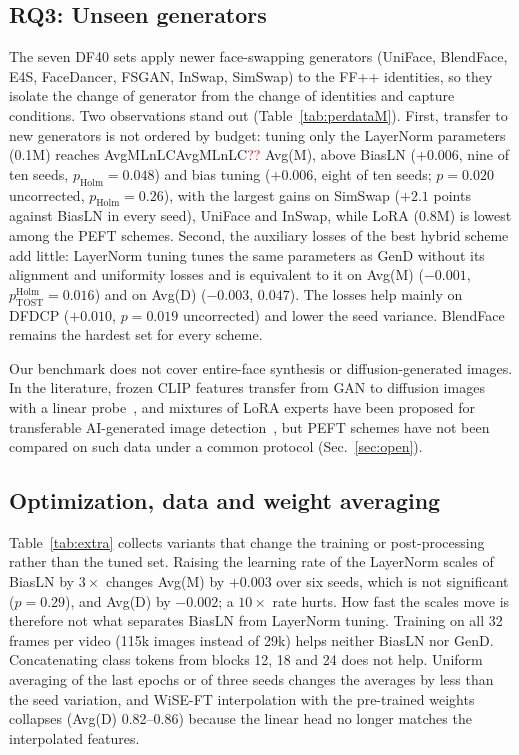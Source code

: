\documentclass[fonts]{icst}
\newcommand{\num}[1]{\ifcsname #1\endcsname\csname #1\endcsname\else\textcolor{red}{??}\fi}
\begin{document}
\subsection{RQ3: Unseen generators}
\label{sec:rq3}
The seven DF40 sets apply newer face-swapping generators (UniFace, BlendFace, E4S, FaceDancer, FSGAN, InSwap, SimSwap) to the FF++ identities, so they isolate the change of generator from the change of identities and capture conditions. Two observations stand out (Table~\ref{tab:perdataM}). First, transfer to new generators is not ordered by budget: tuning only the LayerNorm parameters (0.1M) reaches \num{AvgMLnLC} Avg(M), above BiasLN ($+0.006$, nine of ten seeds, $p_{\mathrm{Holm}}=0.048$) and bias tuning ($+0.006$, eight of ten seeds; $p=0.020$ uncorrected, $p_{\mathrm{Holm}}=0.26$), with the largest gains on SimSwap ($+2.1$ points against BiasLN in every seed), UniFace and InSwap, while LoRA (0.8M) is lowest among the PEFT schemes. Second, the auxiliary losses of the best hybrid scheme add little: LayerNorm tuning tunes the same parameters as GenD without its alignment and uniformity losses and is equivalent to it on Avg(M) ($-0.001$, $p^{\mathrm{Holm}}_{\mathrm{TOST}}=0.016$) and on Avg(D) ($-0.003$, $0.047$). The losses help mainly on DFDCP ($+0.010$, $p=0.019$ uncorrected) and lower the seed variance. BlendFace remains the hardest set for every scheme.

Our benchmark does not cover entire-face synthesis or diffusion-generated images. In the literature, frozen CLIP features transfer from GAN to diffusion images with a linear probe~\cite{ojha2023universal}, and mixtures of LoRA experts have been proposed for transferable AI-generated image detection~\cite{liu2024mole}, but PEFT schemes have not been compared on such data under a common protocol (Sec.~\ref{sec:open}).

\subsection{Optimization, data and weight averaging}
Table~\ref{tab:extra} collects variants that change the training or post-processing rather than the tuned set. Raising the learning rate of the LayerNorm scales of BiasLN by $3\times$ changes Avg(M) by $+0.003$ over six seeds, which is not significant ($p=0.29$), and Avg(D) by $-0.002$; a $10\times$ rate hurts. How fast the scales move is therefore not what separates BiasLN from LayerNorm tuning. Training on all 32 frames per video (115k images instead of 29k) helps neither BiasLN nor GenD. Concatenating class tokens from blocks 12, 18 and 24 does not help. Uniform averaging of the last epochs or of three seeds changes the averages by less than the seed variation, and WiSE-FT interpolation with the pre-trained weights collapses (Avg(D) 0.82--0.86) because the linear head no longer matches the interpolated features.
\end{document}
